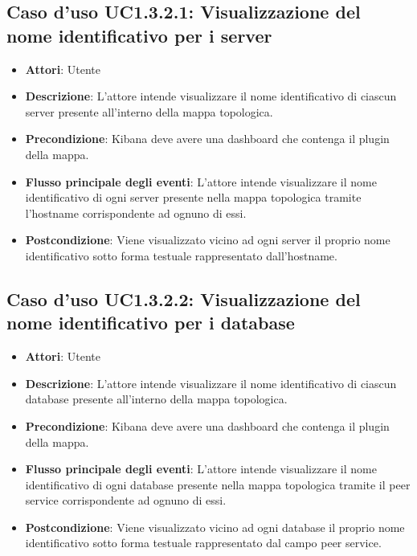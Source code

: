 \subsection{Caso d'uso UC1.3.2.1: Visualizzazione del nome identificativo per i server}
\begin{itemize}
\item \textbf{Attori}: Utente
\item \textbf{Descrizione}: L'attore intende visualizzare il nome identificativo di ciascun server presente all'interno della mappa topologica.
\item \textbf{Precondizione}: Kibana deve avere una dashboard che contenga il plugin della mappa.
\item \textbf{Flusso principale degli eventi}: L'attore intende visualizzare il nome identificativo di ogni server presente nella mappa topologica tramite l'hostname corrispondente ad ognuno di essi.
\item \textbf{Postcondizione}: Viene visualizzato vicino ad ogni server il proprio nome identificativo sotto forma testuale rappresentato dall'hostname.
\end{itemize}
\subsection{Caso d'uso UC1.3.2.2: Visualizzazione del nome identificativo per i database}
\begin{itemize}
\item \textbf{Attori}: Utente
\item \textbf{Descrizione}: L'attore intende visualizzare il nome identificativo di ciascun database presente all'interno della mappa topologica.
\item \textbf{Precondizione}: Kibana deve avere una dashboard che contenga il plugin della mappa.
\item \textbf{Flusso principale degli eventi}: L'attore intende visualizzare il nome identificativo di ogni database presente nella mappa topologica tramite il peer service corrispondente ad ognuno di essi.
\item \textbf{Postcondizione}: Viene visualizzato vicino ad ogni database il proprio nome identificativo sotto forma testuale rappresentato dal campo peer service.
\end{itemize}
